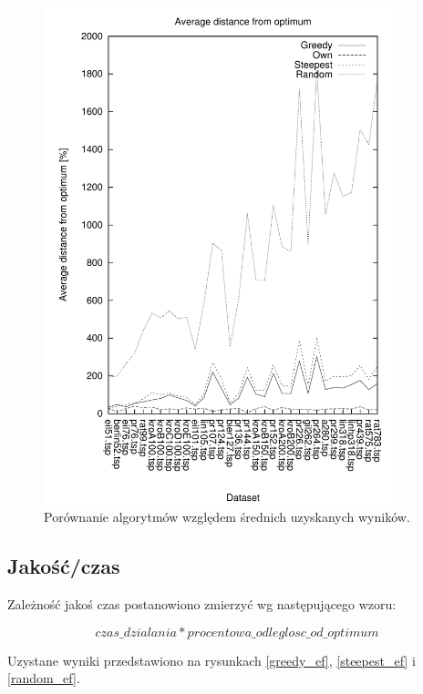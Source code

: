 \begin{figure}
\begin{center}
\includegraphics[width=0.9\textwidth]{wykresy/av_comp}
\end{center}
\caption{Porównanie algorytmów względem średnich uzyskanych wyników.}
\label{av_comp}
\end{figure}

\subsection{Jakość/czas}

Zależność jakoś czas postanowiono zmierzyć wg następującego wzoru:

$$ czas\_dzialania * procentowa\_odleglosc\_od\_optimum $$

Uzystane wyniki przedstawiono na rysunkach \ref{greedy_ef}, \ref{steepest_ef} i
\ref{random_ef}.

